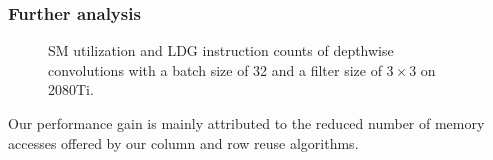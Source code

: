 \subsubsection{Further analysis}
\begin{figure}[t!]
    \centering
    \qquad
    \vspace{-2mm}
    \caption{SM utilization and LDG instruction counts of depthwise convolutions with a batch size of 32 and a filter size of $3\times3$ on 2080Ti.}
    \label{fig:dwratio}
\end{figure}
Our performance gain is mainly attributed to the reduced number of memory accesses offered by our column and row reuse algorithms.

